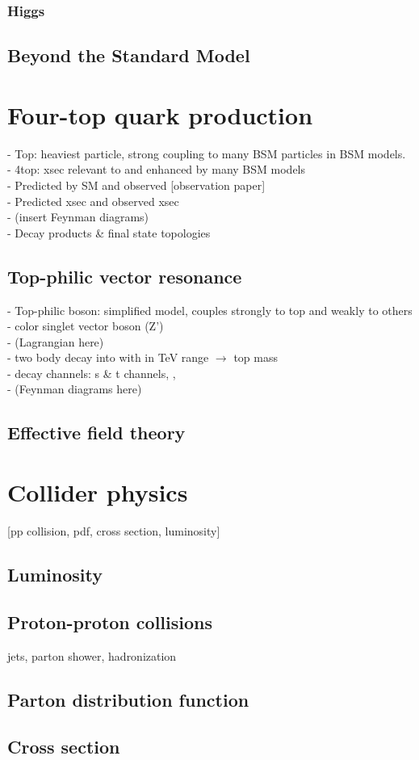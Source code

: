 \documentclass[../thesis.tex]{subfiles}
\begin{document}
\subsubsection*{Higgs}

\subsection{Beyond the Standard Model}


\section{Four-top quark production}
\label{sec:4top}
- Top: heaviest particle, strong coupling to many BSM particles in BSM models.\\
- 4top: xsec relevant to and enhanced by many BSM models\\
- Predicted by SM and observed [observation paper]\\
- Predicted xsec and observed xsec\\
- (insert Feynman diagrams)\\
- Decay products \& final state topologies

\subsection*{Top-philic vector resonance}
- Top-philic boson: simplified model, couples strongly to top and weakly to others\\
- color singlet vector boson (Z')\\
- (Lagrangian here)\\
- two body decay \Zp into \ttbar with \mZp in TeV range $\rightarrow$ top mass\\
- decay channels: \ttZp s \& t channels, \tWZp, \tjZp\\
- (Feynman diagrams here)

\subsection*{Effective field theory}

\section{Collider physics}
[pp collision, pdf, cross section, luminosity]
\subsection*{Luminosity}
\subsection*{Proton-proton collisions}
jets, parton shower, hadronization
\subsection*{Parton distribution function}
\subsection*{Cross section}
\end{document}
